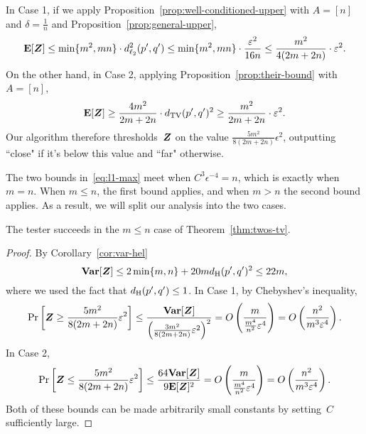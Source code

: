 In Case 1, if we apply Proposition~\ref{prop:well-conditioned-upper} with $A = [n]$ and $\delta = \frac{1}{n}$
and Proposition~\ref{prop:general-upper},
\begin{equation*}
\mbox{\bf E}[\boldsymbol{Z}]
\leq \min\{m^2, mn\} \cdot d_{\ell_2}^2(p',q')
\leq \min\{m^2, mn\} \cdot \frac{\varepsilon^2}{16 n}
\leq \frac{m^2}{4(2m + 2n)} \cdot \varepsilon^2.
\end{equation*}
On the other hand, in Case 2, applying Proposition~\ref{prop:their-bound} with $A = [n]$,
\begin{equation*}
\mbox{\bf E}[\boldsymbol{Z}] \geq \frac{4m^2}{2m + 2n} \cdot d_{\mathrm {TV}}(p',q')^2 \geq \frac{m^2}{2m + 2n} \cdot \varepsilon^2.
\end{equation*}
Our algorithm therefore thresholds~$\boldsymbol{Z}$ on the value $\frac{5 m^2}{8(2m +2n)} \epsilon^2$,
outputting ``close" if it's below this value and ``far" otherwise.

The two bounds in~\eqref{eq:l1-max} meet when $C^3 \epsilon^{-4} = n$,
which is exactly when $m = n$.
When $m \leq n$, the first bound applies, and when $m > n$ the second bound applies.
As a result, we will split our analysis into the two cases.

\begin{lemma}
The tester succeeds in the $m \leq n$ case of Theorem~\ref{thm:twos-tv}.
\end{lemma}
\begin{proof}
By Corollary~\ref{cor:var-hel}
\begin{equation*}
\mbox{\bf Var}[\boldsymbol{Z}] \leq 2 \min\{m, n\} +  20m d_{\mathrm {H}}(p',q')^2
\leq 22m,
\end{equation*}
where we used the fact that $d_{\mathrm {H}}(p',q') \leq 1$.
In Case 1, by Chebyshev's inequality,
\begin{equation*}
\Pr\left[\boldsymbol{Z} \geq \frac{5 m^2}{8(2m +2n)} \varepsilon^2\right]
\leq \frac{\mbox{\bf Var}[\boldsymbol{Z}]}{\left(\frac{3m^2}{8(2m +2n)} \varepsilon^2\right)^2}
= O\left(\frac{m}{\frac{m^4}{n^2} \varepsilon^4}\right)
= O\left(\frac{n^2}{m^3 \varepsilon^4}\right).
\end{equation*}
In Case 2,
\begin{equation*}
\Pr\left[\boldsymbol{Z} \leq \frac{5 m^2}{8(2m +2n)} \varepsilon^2\right]
\leq \frac{64 \mbox{\bf Var}[\boldsymbol{Z}]}{9\mbox{\bf E}[\boldsymbol{Z}]^2}
= O\left(\frac{m}{\frac{m^4}{n^2} \varepsilon^4}\right)
= O\left(\frac{n^2}{m^3 \varepsilon^4}\right).
\end{equation*}
Both of these bounds can be made arbitrarily small constants by setting~$C$ sufficiently large.
\end{proof}

